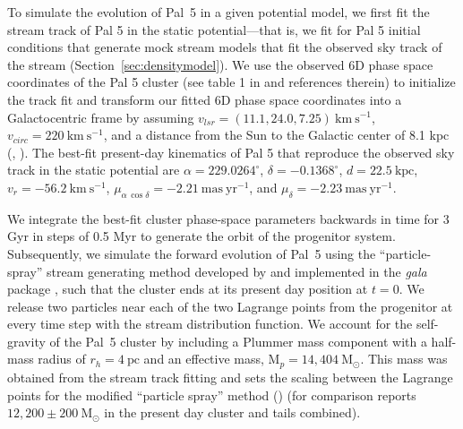 \documentclass[twocolumn]{aastex62}
\newcommand{\package}[1]{\textsl{#1}}
\newcommand{\msun}{\textrm{M}_\odot}
\newcommand{\kpc}{\textrm{kpc}}
\newcommand{\kms}{\ensuremath{\textrm{km}~\textrm{s}^{-1}}}
\newcommand{\masyr}{\ensuremath{\textrm{mas}~\textrm{yr}^{-1}}}
\newcommand{\ab}[1]{{\color{teal} AB: #1}}
\newcommand{\sa}[1]{{\color{magenta} SP: #1}}
\begin{document}
To simulate the evolution of Pal~5 in a given potential model, we first fit the stream track of Pal 5 in the static potential---that is, we fit for Pal 5 initial conditions that generate mock stream models that fit the observed sky track of the stream (Section~\ref{sec:densitymodel}).
We use the observed 6D phase space coordinates of the Pal 5 cluster (see table 1 in \citealt{Pearson:2017} and references therein) to initialize the track fit and transform our fitted 6D phase space coordinates into a Galactocentric frame by assuming $v_{lsr} = (11.1, 24.0, 7.25) ~\kms$,  $v_{circ} = 220~\kms$, and a distance from the Sun to the Galactic center of 8.1 kpc (\citealt{Schonrich:2010}, \citealt{Schonrich:2012}). 
The best-fit present-day kinematics of Pal 5 that reproduce the observed sky track in the static potential are $\alpha = 229.0264^\circ$, $\delta = -0.1368^\circ$, $d = 22.5~\kpc$, $v_r = -56.2~\kms$, $\mu_{\alpha\,\cos\delta} = -2.21~\masyr$, and $\mu_\delta = -2.23~\masyr$.

We integrate the best-fit cluster phase-space parameters backwards in time for 3 Gyr in steps of 0.5 Myr to generate the orbit of the progenitor system. %
Subsequently, we simulate the forward evolution of Pal~5 using the ``particle-spray'' stream generating method developed by \citet{Fardal:2015} and implemented in the \package{gala} package \citep{gala}, such that the cluster ends at its present day position at $t = 0$.
We release two particles near each of the two Lagrange points from the progenitor at every time step with the \citet{Fardal:2015} stream distribution function. %
We account for the self-gravity of the Pal~5 cluster by including a Plummer mass component with a half-mass radius of $r_h = 4~\textrm{pc}$ and an effective mass, $\textrm{M}_p = 14,404~\msun$. This mass was obtained from the stream track fitting and sets the scaling between the Lagrange points for the modified ``particle spray'' method (\citealt{Fardal:2015}) (for comparison \citet{Ibata:2017} reports $12,200 \pm 200~\msun$ in the present day cluster and tails combined).
\end{document}
